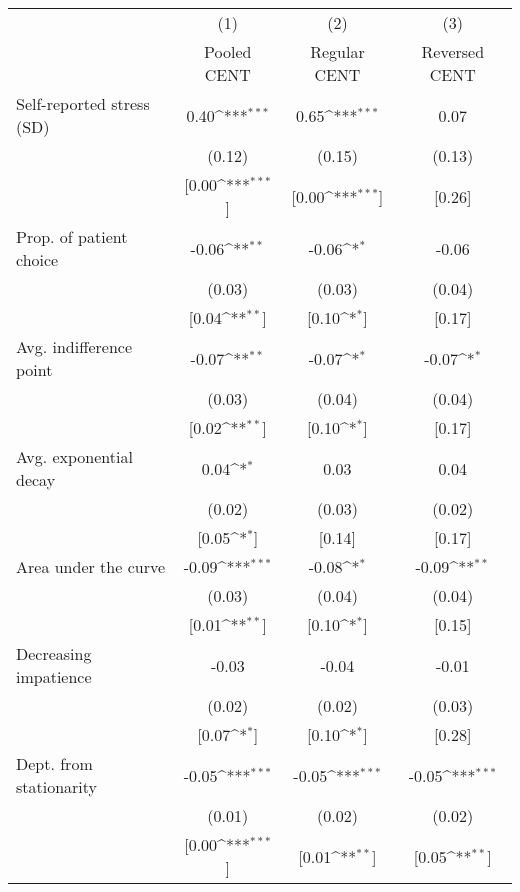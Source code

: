 {
\def\sym#1{\ifmmode^{#1}\else\(^{#1}\)\fi}
\begin{tabular}{l*{3}{c}}
\toprule
          &\multicolumn{1}{c}{(1)}&\multicolumn{1}{c}{(2)}&\multicolumn{1}{c}{(3)}\\
          &\multicolumn{1}{c}{Pooled CENT}&\multicolumn{1}{c}{Regular CENT}&\multicolumn{1}{c}{Reversed CENT}\\
\midrule
Self-reported stress (SD)&0.40\sym{***}&0.65\sym{***}&     0.07\\
          &   (0.12)&   (0.15)&   (0.13)\\
          &[0.00\sym{***}]&[0.00\sym{***}]&   [0.26]\\
Prop. of patient choice&-0.06\sym{**}&-0.06\sym{*}&    -0.06\\
          &   (0.03)&   (0.03)&   (0.04)\\
          &[0.04\sym{**}]&[0.10\sym{*}]&   [0.17]\\
Avg. indifference point&-0.07\sym{**}&-0.07\sym{*}&-0.07\sym{*}\\
          &   (0.03)&   (0.04)&   (0.04)\\
          &[0.02\sym{**}]&[0.10\sym{*}]&   [0.17]\\
Avg. exponential decay&0.04\sym{*}&     0.03&     0.04\\
          &   (0.02)&   (0.03)&   (0.02)\\
          &[0.05\sym{*}]&   [0.14]&   [0.17]\\
Area under the curve&-0.09\sym{***}&-0.08\sym{*}&-0.09\sym{**}\\
          &   (0.03)&   (0.04)&   (0.04)\\
          &[0.01\sym{**}]&[0.10\sym{*}]&   [0.15]\\
Decreasing impatience&    -0.03&    -0.04&    -0.01\\
          &   (0.02)&   (0.02)&   (0.03)\\
          &[0.07\sym{*}]&[0.10\sym{*}]&   [0.28]\\
Dept. from stationarity&-0.05\sym{***}&-0.05\sym{***}&-0.05\sym{***}\\
          &   (0.01)&   (0.02)&   (0.02)\\
          &[0.00\sym{***}]&[0.01\sym{**}]&[0.05\sym{**}]\\
\bottomrule
\end{tabular}
}
